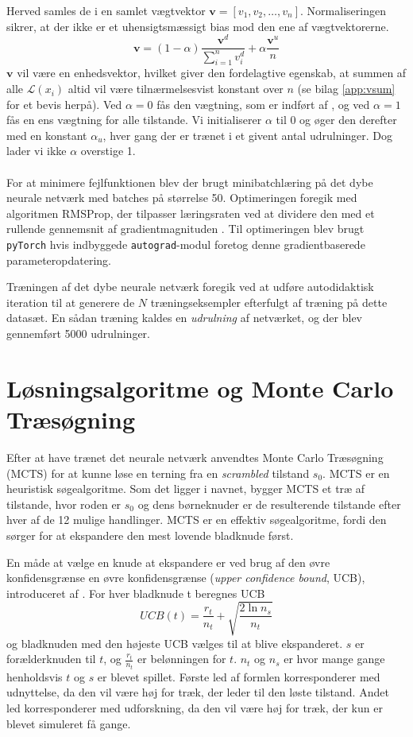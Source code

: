 \documentclass[../main.tex]{subfiles}
\begin{document}
Herved samles de i en samlet vægtvektor $ \mathbf v=[v_1, v_2, \ldots, v_n] $.
Normaliseringen sikrer, at der ikke er et uhensigtsmæssigt bias mod den ene af vægtvektorerne.
\begin{equation*}
	\mathbf v=(1-\alpha)\frac{\mathbf v^d}{\sum_{i=1}^n v_i^d} + \alpha \frac{\mathbf v^u}{n}
\end{equation*}
$ \mathbf v $ vil være en enhedsvektor, hvilket giver den fordelagtive egenskab, at summen af alle $ \mathcal L(x_i) $ altid vil være tilnærmelsesvist konstant over $ n $ (se bilag \ref{app:vsum} for et bevis herpå).
Ved $ \alpha=0 $ fås den vægtning, som er indført af \cite{HumansBeGone}, og ved $ \alpha=1 $ fås en ens vægtning for alle tilstande.
Vi initialiserer $ \alpha $ til 0 og øger den derefter med en konstant $ \alpha_u $, hver gang der er trænet i et givent antal udrulninger.
Dog lader vi ikke $ \alpha $ overstige 1.
\\
\\
For at minimere fejlfunktionen blev der brugt minibatchlæring på det dybe neurale netværk med batches på størrelse 50.
Optimeringen foregik med algoritmen RMSProp, der tilpasser læringsraten ved at dividere den med et rullende gennemsnit af gradientmagnituden \cite{RMSProp}.
Til optimeringen blev brugt \texttt{pyTorch} hvis indbyggede \texttt{autograd}-modul foretog denne gradientbaserede parameteropdatering.

Træningen af det dybe neurale netværk foregik ved at udføre autodidaktisk iteration til at generere de \(N\) træningseksempler efterfulgt af træning på dette datasæt. 
En sådan træning kaldes en \textit{udrulning} af netværket, og der blev gennemført 5000 udrulninger.

\section{Løsningsalgoritme og Monte Carlo Træsøgning}
Efter at have trænet det neurale netværk anvendtes Monte Carlo Træsøgning (MCTS) for at kunne løse en terning fra en \emph{scrambled} tilstand $s_0$.
MCTS er en heuristisk søgealgoritme.
Som det ligger i navnet, bygger MCTS et træ af tilstande, hvor roden er $s_0$ og dens børneknuder er de resulterende tilstande efter hver af de 12 mulige handlinger.
MCTS er en effektiv søgealgoritme, fordi den sørger for at ekspandere den mest lovende bladknude først. 

En måde at vælge en knude at ekspandere er ved brug af den øvre konfidensgrænse en øvre konfidensgrænse (\emph{upper confidence bound}, UCB), introduceret af \cite{Kocsis06banditbased}.
For hver bladknude t beregnes UCB
$$UCB(t)=\frac{r_t}{n_t}+\sqrt{\frac{2\ln n_s}{n_t}}$$
og bladknuden med den højeste UCB vælges til at blive ekspanderet.
$s$ er forælderknuden til $t$, og $\frac{r_t}{n_t}$ er belønningen for $t$.
$n_t$ og $n_s$ er hvor mange gange henholdsvis $t$ og $s$ er blevet spillet.
Første led af formlen korresponderer med udnyttelse, da den vil være høj for træk, der leder til den løste tilstand.
Andet led korresponderer med udforskning, da den vil være høj for træk, der kun er blevet simuleret få gange. 
\end{document}
